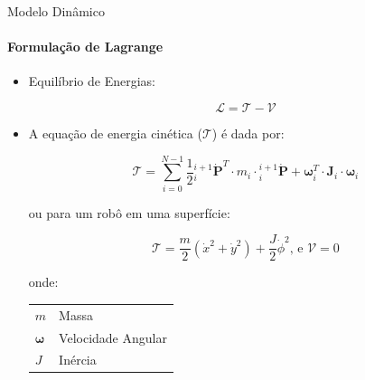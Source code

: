 \documentclass{beamer}
\begin{document}
\begin{frame}{Modelo Dinâmico}
    \framesubtitle{Formulação de Lagrange}

    \begin{itemize}

        \item Equilíbrio de Energias:

              \begin{equation}
                  \mathcal{L}= \mathcal{T} - \mathcal{V}
              \end{equation}

        \item A equação de energia cinética ($\mathcal{T}$) é dada por:

              \begin{equation}
                  \mathcal{T} = \sum\limits_{i=0}^{N-1} \frac{1}{2} {}_{i}^{i+1}\dot{\mathbf{P}}^T\cdot m_{i}\cdot {}_{i}^{i+1}\dot{\mathbf{P}}+ \mathbf{\omega}_i^T\cdot \mathbf{J}_i \cdot \mathbf{\omega}_i
              \end{equation}

              \begin{block}{ou para um robô em uma superfície:}

                  \begin{equation*}
                      \boxed{
                          \mathcal{T} = \frac{m}{2}\left(\dot{x}^2+\dot{y}^2 \right)+ \frac{J}{2}\dot{\phi}^2}
                      \text{, e  }
                      \boxed{\mathcal{V} = 0}
                  \end{equation*}
                  \scriptsize{
                      onde:
                      \begin{tabular}{l|l}
                          $m$               & Massa              \\
                          $\mathbf{\omega}$ & Velocidade Angular \\
                          $J$               & Inércia            \\
                      \end{tabular}}
              \end{block}
    \end{itemize}
\end{frame}
\end{document}
